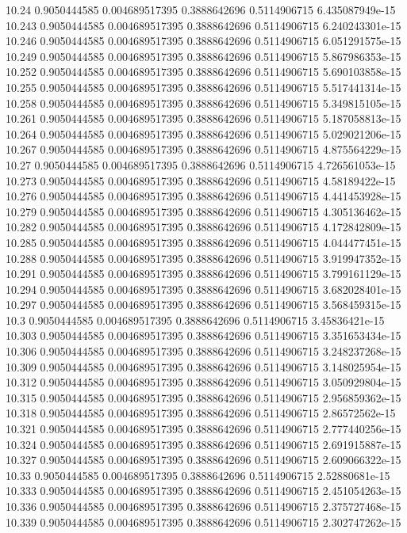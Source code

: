 {10.24 0.9050444585 0.004689517395 0.3888642696 0.5114906715 6.435087949e-15
10.243 0.9050444585 0.004689517395 0.3888642696 0.5114906715 6.240243301e-15
10.246 0.9050444585 0.004689517395 0.3888642696 0.5114906715 6.051291575e-15
10.249 0.9050444585 0.004689517395 0.3888642696 0.5114906715 5.867986353e-15
10.252 0.9050444585 0.004689517395 0.3888642696 0.5114906715 5.690103858e-15
10.255 0.9050444585 0.004689517395 0.3888642696 0.5114906715 5.517441314e-15
10.258 0.9050444585 0.004689517395 0.3888642696 0.5114906715 5.349815105e-15
10.261 0.9050444585 0.004689517395 0.3888642696 0.5114906715 5.187058813e-15
10.264 0.9050444585 0.004689517395 0.3888642696 0.5114906715 5.029021206e-15
10.267 0.9050444585 0.004689517395 0.3888642696 0.5114906715 4.875564229e-15
10.27 0.9050444585 0.004689517395 0.3888642696 0.5114906715 4.726561053e-15
10.273 0.9050444585 0.004689517395 0.3888642696 0.5114906715 4.58189422e-15
10.276 0.9050444585 0.004689517395 0.3888642696 0.5114906715 4.441453928e-15
10.279 0.9050444585 0.004689517395 0.3888642696 0.5114906715 4.305136462e-15
10.282 0.9050444585 0.004689517395 0.3888642696 0.5114906715 4.172842809e-15
10.285 0.9050444585 0.004689517395 0.3888642696 0.5114906715 4.044477451e-15
10.288 0.9050444585 0.004689517395 0.3888642696 0.5114906715 3.919947352e-15
10.291 0.9050444585 0.004689517395 0.3888642696 0.5114906715 3.799161129e-15
10.294 0.9050444585 0.004689517395 0.3888642696 0.5114906715 3.682028401e-15
10.297 0.9050444585 0.004689517395 0.3888642696 0.5114906715 3.568459315e-15
10.3 0.9050444585 0.004689517395 0.3888642696 0.5114906715 3.45836421e-15
10.303 0.9050444585 0.004689517395 0.3888642696 0.5114906715 3.351653434e-15
10.306 0.9050444585 0.004689517395 0.3888642696 0.5114906715 3.248237268e-15
10.309 0.9050444585 0.004689517395 0.3888642696 0.5114906715 3.148025954e-15
10.312 0.9050444585 0.004689517395 0.3888642696 0.5114906715 3.050929804e-15
10.315 0.9050444585 0.004689517395 0.3888642696 0.5114906715 2.956859362e-15
10.318 0.9050444585 0.004689517395 0.3888642696 0.5114906715 2.86572562e-15
10.321 0.9050444585 0.004689517395 0.3888642696 0.5114906715 2.777440256e-15
10.324 0.9050444585 0.004689517395 0.3888642696 0.5114906715 2.691915887e-15
10.327 0.9050444585 0.004689517395 0.3888642696 0.5114906715 2.609066322e-15
10.33 0.9050444585 0.004689517395 0.3888642696 0.5114906715 2.52880681e-15
10.333 0.9050444585 0.004689517395 0.3888642696 0.5114906715 2.451054263e-15
10.336 0.9050444585 0.004689517395 0.3888642696 0.5114906715 2.375727468e-15
10.339 0.9050444585 0.004689517395 0.3888642696 0.5114906715 2.302747262e-15
}
